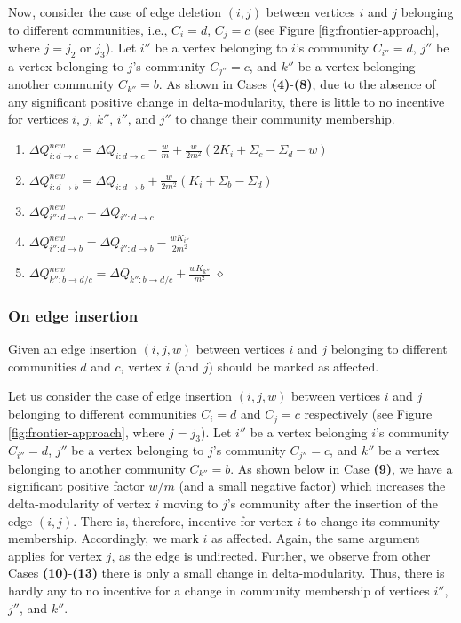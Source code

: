 Now, consider the case of edge deletion $(i, j)$ between vertices $i$ and $j$ belonging to different communities, i.e., $C_i = d$, $C_j = c$ (see Figure \ref{fig:frontier-approach}, where $j = j_2$ or $j_3$). Let $i''$ be a vertex belonging to $i$'s community $C_{i''} = d$, $j''$ be a vertex belonging to $j$'s community $C_{j''} = c$, and $k''$ be a vertex belonging another community $C_{k''} = b$. As shown in Cases \textbf{(4)}-\textbf{(8)}, due to the absence of any significant positive change in delta-modularity, there is little to no incentive for vertices $i$, $j$, $k''$, $i''$, and $j''$ to change their community membership.

\begin{enumerate}[start=4]
  \item $\Delta Q_{i:d \rightarrow c}^{new} = \Delta Q_{i:d \rightarrow c} - \frac{w}{m} + \frac{w}{2m^2} (2K_i + \Sigma_c - \Sigma_d - w)$
  \item $\Delta Q_{i:d \rightarrow b}^{new} = \Delta Q_{i:d \rightarrow b} + \frac{w}{2m^2} (K_i + \Sigma_b - \Sigma_d)$
  \item $\Delta Q_{i'':d \rightarrow c}^{new} = \Delta Q_{i'':d \rightarrow c}$
  \item $\Delta Q_{i'':d \rightarrow b}^{new} = \Delta Q_{i'':d \rightarrow b} - \frac{wK_{i''}}{2m^2}$
  \item $\Delta Q_{k'':b \rightarrow d/c}^{new} = \Delta Q_{k'':b \rightarrow d/c} + \frac{wK_{k''}}{m^2}$ \hfill $\diamond$
\end{enumerate}




\subsubsection{On edge insertion}

\begin{lemma}
\label{thm:louvain--mark-insertion}
Given an edge insertion $(i, j, w)$ between vertices $i$ and $j$ belonging to different communities $d$ and $c$, vertex $i$ (and $j$) should be marked as affected.
\end{lemma}

Let us consider the case of edge insertion $(i, j, w)$ between vertices $i$ and $j$ belonging to different communities $C_i = d$ and $C_j = c$ respectively (see Figure \ref{fig:frontier-approach}, where $j = j_3$). Let $i''$ be a vertex belonging $i$'s community $C_{i''} = d$, $j''$ be a vertex belonging to $j$'s community $C_{j''} = c$, and $k''$ be a vertex belonging to another community $C_{k''} = b$. As shown below in Case \textbf{(9)}, we have a significant positive factor $w/m$ (and a small negative factor) which increases the delta-modularity of vertex $i$ moving to $j$'s community after the insertion of the edge $(i, j)$. There is, therefore, incentive for vertex $i$ to change its community membership. Accordingly, we mark $i$ as affected. Again, the same argument applies for vertex $j$, as the edge is undirected. Further, we observe from other Cases \textbf{(10)}-\textbf{(13)} there is only a small change in delta-modularity. Thus, there is hardly any to no incentive for a change in community membership of vertices $i''$, $j''$, and $k''$.

